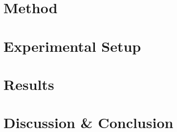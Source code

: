 \section{Method}\label{sec:1-tactile-perception-method}


\section{Experimental Setup}\label{sec:1-tactile-perception-experimental-setup}


\section{Results}\label{sec:1-tactile-perception-results}


\section{Discussion \& Conclusion}\label{sec:1-tactile-perception-discussion-and-conclusion}




